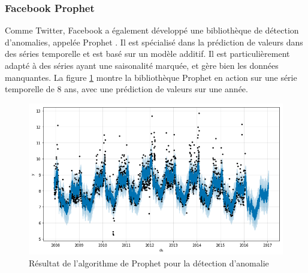 \documentclass[paper=a4, fontsize=11pt]{scrartcl}
\begin{document}
\subsubsection{Facebook Prophet}
Comme Twitter, Facebook a également développé une bibliothèque de détection d'anomalies, appelée Prophet \cite{noauthor_prophet_nodate}. Il est spécialisé dans la prédiction de valeurs dans des séries temporelle et est basé sur un modèle additif. Il est particulièrement adapté à des séries ayant une saisonalité marquée, et gère bien les données manquantes. La figure \ref{f-FacebookProphet} montre la bibliothèque Prophet en action sur une série temporelle de 8 ans, avec une prédiction de valeurs sur une année.

\begin{figure}[H]
    \centering
    \includegraphics[width=18cm]{img/facebook_prophet.png}
    \caption{Résultat de l'algorithme de Prophet pour la détection d'anomalie \cite{noauthor_quick_nodate}}
    \label{f-FacebookProphet}
\end{figure}
\end{document}
